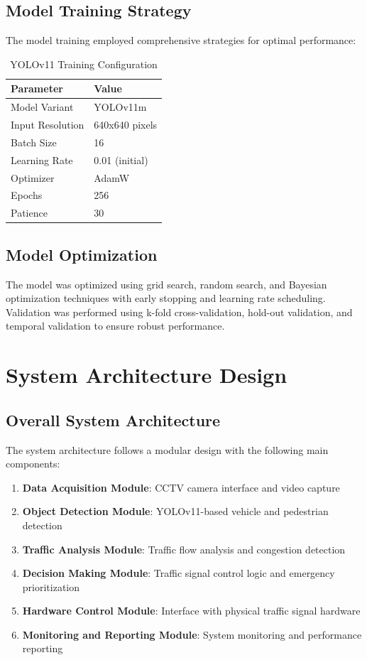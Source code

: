 \subsection{Model Training Strategy}

The model training employed comprehensive strategies for optimal performance:

\begin{table}[h]
\centering
\caption{YOLOv11 Training Configuration}
\begin{tabular}{|l|l|}
\hline
\textbf{Parameter} & \textbf{Value} \\
\hline
Model Variant & YOLOv11m \\
Input Resolution & 640x640 pixels \\
Batch Size & 16 \\
Learning Rate & 0.01 (initial) \\
Optimizer & AdamW \\
Epochs & 256 \\
Patience & 30 \\
\hline
\end{tabular}
\end{table}

\subsection{Model Optimization}

The model was optimized using grid search, random search, and Bayesian optimization techniques with early stopping and learning rate scheduling. Validation was performed using k-fold cross-validation, hold-out validation, and temporal validation to ensure robust performance.

\section{System Architecture Design}

\subsection{Overall System Architecture}

The system architecture follows a modular design with the following main components:

\begin{enumerate}
    \item \textbf{Data Acquisition Module}: CCTV camera interface and video capture
    \item \textbf{Object Detection Module}: YOLOv11-based vehicle and pedestrian detection
    \item \textbf{Traffic Analysis Module}: Traffic flow analysis and congestion detection
    \item \textbf{Decision Making Module}: Traffic signal control logic and emergency prioritization
    \item \textbf{Hardware Control Module}: Interface with physical traffic signal hardware
    \item \textbf{Monitoring and Reporting Module}: System monitoring and performance reporting
\end{enumerate}

